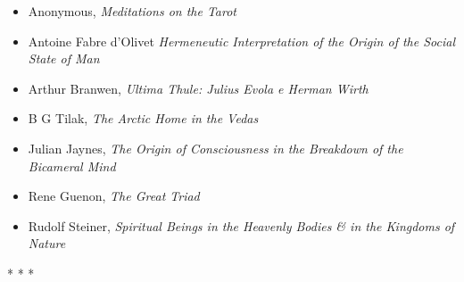 \begin{itemize}
\item Anonymous, \emph{Meditations on the Tarot} 
\item Antoine Fabre d'Olivet \emph{Hermeneutic Interpretation of the Origin of the Social State of Man} 
\item Arthur Branwen, \emph{Ultima Thule: Julius Evola e Herman Wirth} 
\item B G Tilak, \emph{The Arctic Home in the Vedas} 
\item Julian Jaynes, \emph{The Origin of Consciousness in the Breakdown of the Bicameral Mind} 
\item Rene Guenon, \emph{The Great Triad} 
\item Rudolf Steiner, \emph{Spiritual Beings in the Heavenly Bodies \& in the Kingdoms of Nature} 
\end{itemize}



\begin{center}* * *\end{center}

